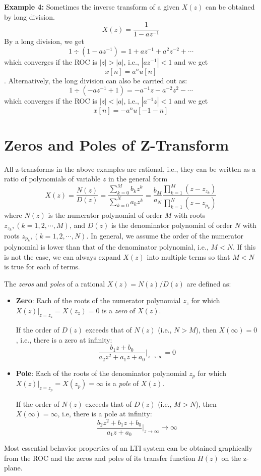 {\bf Example 4: } Sometimes the inverse transform of a given $X(z)$ can be
obtained by long division.
\[ X(z)=\frac{1}{1-az^{-1}} \]
By a long division, we get
\[ 1\div (1-az^{-1})=1+az^{-1}+a^2z^{-2}+\cdots \]
which converges if the ROC is $|z|>|a|$, i.e., $|az^{-1}|<1$ and we get
\[ x[n]=a^n u[n] \].
Alternatively, the long division can also be carried out as:
\[ 1\div (-az^{-1}+1)=-a^{-1}z-a^{-2}z^2-\cdots \]
which converges if the ROC is $|z|<|a|$, i.e., $|a^{-1}z|<1$ and we get
\[ x[n]=-a^n u[-1-n] \]

\newpage
\section*{Zeros and Poles of Z-Transform}

All z-transforms in the above examples are rational, i.e., they can 
be written as a ratio of polynomials of variable $z$ in the general form
\[	
X(z)=\frac{N(z)}{D(z)}=\frac{\sum_{k=0}^M b_k z^k }{\sum_{k=0}^N a_k z^k}
=\frac{b_M}{a_N}\frac{\prod_{k=1}^M (z-z_{z_k})}{\prod_{k=1}^N (z-z_{p_k})} 
\]
where $N(z)$ is the numerator polynomial of order $M$ with roots $z_{z_k}, (k=1,2, 
\cdots, M)$, and $D(z)$ is the denominator polynomial of order $N$ with roots 
$z_{p_k}, (k=1,2, \cdots, N)$. In general, we assume the order of the numerator
polynomial is lower than that of the denominator polynomial, i.e.,  $M < N$. If 
this is not the case, we can always expand $X(z)$ into multiple terms so that $M<N$
is true for each of terms.

The {\em zeros} and {\em poles} of a rational $X(z)=N(z)/D(z)$ are defined as:
\begin{itemize}
\item {\bf Zero}: 
  Each of the roots of the numerator polynomial $z_z$ for which 
  $X(z)\bigg|_{z=z_z}=X(z_z)=0$ is a {\em zero} of $X(z)$.

  If the order of $D(z)$ exceeds that of $N(z)$ (i.e., $N>M$), then 
  $X(\infty)=0$, i.e., there is a zero at infinity:
  \[	\frac{b_1z+b_0}{a_2z^2+a_1z+a_0} \bigg|_{z \rightarrow \infty} =0	\]

\item {\bf Pole}:
  Each of the roots of the denominator polynomial $z_p$ for which 
  $X(z)\bigg|_{z=z_p}=X(z_p)=\infty$ is a {\em pole} of $X(z)$.

  If the order of $N(z)$ exceeds that of $D(z)$ (i.e., $M>N$), then 
  $X(\infty)=\infty$, i.e, there is a pole at infinity: 
  \[	\frac{b_2z^2+b_1z+b_0}{a_1z+a_0} \bigg|_{z \rightarrow \infty} \rightarrow \infty \]

\end{itemize}
Most essential behavior properties of an LTI system can be obtained graphically
from the ROC and the zeros and poles of its transfer function $H(z)$ on the z-plane.

